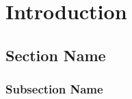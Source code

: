\chapter{Introduction}
\label{introduction}

\section{Section Name}

\subsection{Subsection Name}



